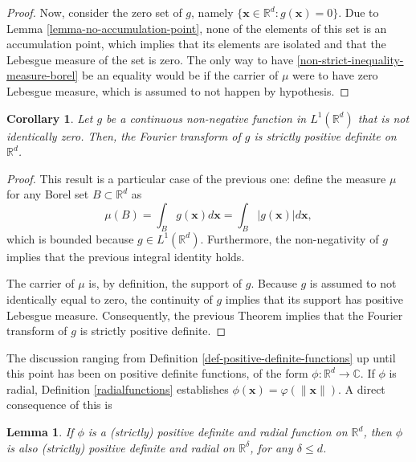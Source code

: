 \documentclass[12pt]{report} %
\newtheorem{corollary}{Corollary}
\newtheorem{lemma}{Lemma}
\newcommand{\tmmathbf}[1]{\ensuremath{\boldsymbol{#1}}}
\begin{document}
\begin{proof}
  Now, consider the zero set of $g$, namely $\{ \tmmathbf{x} \in \mathbb{R}^d
    : g (\tmmathbf{x}) = 0 \}$. Due to Lemma \ref{lemma-no-accumulation-point},
  none of the elements of this set is an accumulation point, which implies
  that its elements are isolated and that the Lebesgue measure of the set is
  zero. The only way to have \eqref{non-strict-inequality-measure-borel} be an
  equality would be if the carrier of $\mu$ were to have zero Lebesgue
  measure, which is assumed to not happen by hypothesis.
\end{proof}

\begin{corollary}\label{cor-fourier-strictly-positive-def}
  Let $g$ be a continuous non-negative function in $L^1 (\mathbb{R}^d)$ that
  is not identically zero. Then, the Fourier transform of $g$ is strictly
  positive definite on $\mathbb{R}^d$.
\end{corollary}

\begin{proof}
  This result is a particular case of the previous one: define the measure
  $\mu$ for any Borel set $B \subset \mathbb{R}^d$ as
  \[ \mu (B) = \int_B g (\tmmathbf{x}) d\tmmathbf{x}= \int_B | g
    (\tmmathbf{x}) | d\tmmathbf{x}, \]
  which is bounded because $g \in L^1 (\mathbb{R}^d)$. Furthermore, the
  non-negativity of $g$ implies that the previous integral identity holds.

  The carrier of $\mu$ is, by definition, the support of $g$. Because $g$ is
  assumed to not identically equal to zero, the continuity of $g$ implies that
  its support has positive Lebesgue measure. Consequently, the previous
  Theorem implies that the Fourier transform of $g$ is strictly positive
  definite.
\end{proof}

The discussion ranging from Definition \ref{def-positive-definite-functions}
up until this point has been on positive definite functions, of the form $\phi
  : \mathbb{R}^d \rightarrow \mathbb{C}$. If $\phi$ is radial, Definition
\ref{radialfunctions} establishes $\phi (\tmmathbf{x}) = \varphi (\|
  \tmmathbf{x} \|)$. A direct consequence of this is

\begin{lemma}
  If $\phi$ is a (strictly) positive definite and radial function on
  $\mathbb{R}^d$, then $\phi$ is also (strictly) positive definite and radial
  on $\mathbb{R}^{\delta}$, for any $\delta \leq d$.
\end{lemma}
\end{document}
